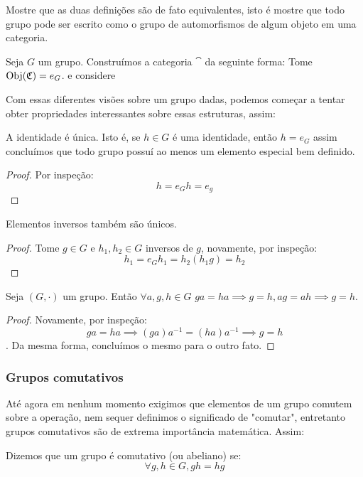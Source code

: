 \documentclass[../main]{subfiles}
\begin{document}
\begin{exercise}
    Mostre que as duas definições são de fato equivalentes, isto é mostre que
    todo grupo pode ser escrito como o grupo de automorfismos de algum objeto em
    uma categoria.
\end{exercise}
\begin{answer}
    Seja \(G\) um grupo. Construímos a categoria \(\cat\) da seguinte forma:
    Tome \(\text{Obj}(\mathfrak{C}) = e_G\). e considere 
\end{answer}
Com essas diferentes visões sobre um grupo dadas, podemos começar a tentar obter
propriedades interessantes sobre essas estruturas, assim:
\begin{prop}
    A identidade é única. Isto é, se \(h \in G\) é uma identidade, então \(h =
    e_G\) assim concluímos que todo grupo possuí ao menos um elemento especial
    bem definido.
\end{prop}
\begin{proof}
    Por inspeção:
    \[h = e_G h = e_g\]
\end{proof}

\begin{prop}
    Elementos inversos também são únicos.
\end{prop}
\begin{proof}
    Tome \(g \in G\) e \(h_1, h_2 \in G\) inversos de \(g\), novamente, por
    inspeção:
    \[h_1 = e_G h_1 = h_2(h_1 g) = h_2\]
\end{proof}
\begin{prop}
    Seja \((G, \cdot)\) um grupo. Então \(\forall a, g, h \in G\) \(ga = ha
    \implies g = h, ag = ah \implies g = h\). 
\end{prop}
\begin{proof}
    Novamente, por inspeção:
    \[ga = ha \implies (ga)a^{-1} = (ha)a^{-1} \implies g = h\]. Da mesma forma,
    concluímos o mesmo para o outro fato.
\end{proof}

\subsubsection*{Grupos comutativos}

Até agora em nenhum momento exigimos que elementos de um grupo comutem sobre a
operação, nem sequer definimos o significado de "comutar", entretanto grupos
comutativos são de extrema importância matemática. Assim:
\begin{definition}
    Dizemos que um grupo é comutativo (ou abeliano) se:
    \[\forall g, h \in G, gh = hg\]    
\end{definition}
\end{document}
